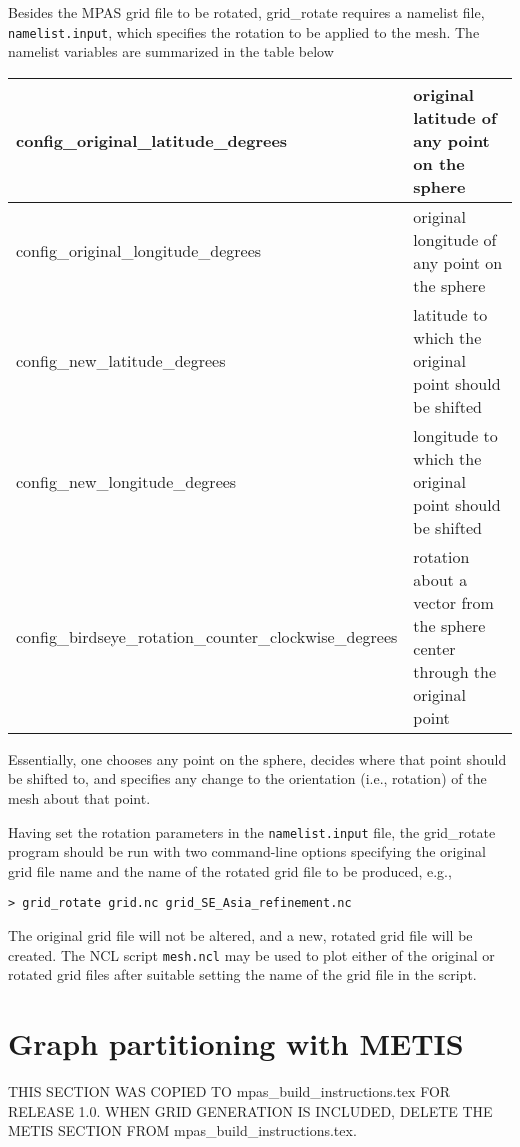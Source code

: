 Besides the MPAS grid file to be rotated, grid\_rotate requires a namelist file, {\tt namelist.input}, which specifies the rotation to be applied to the mesh. The namelist variables are summarized in the table below
   
\vspace{12pt}
\begin{longtable}{|p{3.25in} |p{2.5in}|}
\hline
config\_original\_latitude\_degrees & original latitude of any point on the sphere \\ \hline
config\_original\_longitude\_degrees & original longitude of any point on the sphere \\ \hline
config\_new\_latitude\_degrees &  latitude to which the original point should be shifted \\ \hline
config\_new\_longitude\_degrees &  longitude to which the original point should be shifted \\ \hline
config\_birdseye\_rotation\_counter\_clockwise\_degrees & rotation about a vector from the sphere center through the original point \\ \hline
\end{longtable}
\vspace{12pt}

\noindent Essentially, one chooses any point on the sphere, decides where that point should be shifted to,
and specifies any change to the orientation (i.e., rotation) of the mesh about that point. 

Having set the rotation parameters in the {\tt namelist.input} file, the grid\_rotate program should be run with two command-line options
specifying the original grid file name and the name of the rotated grid file to be produced, e.g.,

\vspace{12pt}
{\tt > grid\_rotate grid.nc grid\_SE\_Asia\_refinement.nc}
\vspace{12pt}

The original grid file will not be altered, and a new, rotated grid file will be created. The NCL script {\tt mesh.ncl} may be used to plot either of the original or rotated grid files after suitable setting the name of the grid file in the script.
   
   
\section{Graph partitioning with METIS} 
\label{sec:metis}

{\color{red} THIS SECTION WAS COPIED TO mpas_build_instructions.tex  FOR RELEASE 1.0. WHEN GRID GENERATION IS INCLUDED, DELETE THE METIS SECTION FROM mpas_build_instructions.tex}.

